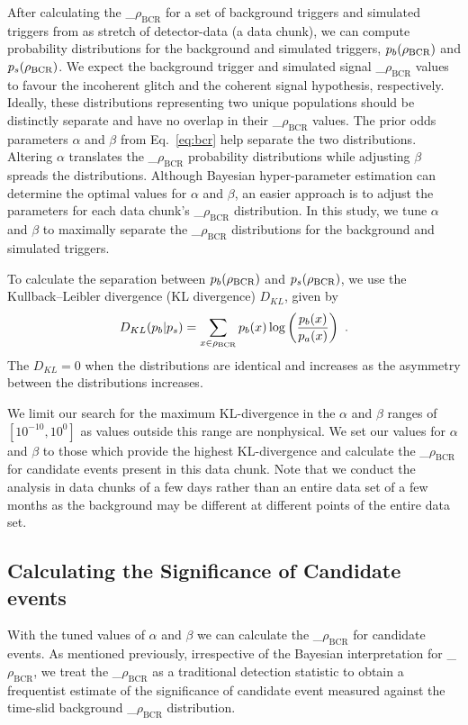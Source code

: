 \documentclass[%
 nofootinbib,
 amsmath,amssymb,
 aps,
 twocolumn
]{revtex4-2}
\newcommand{\mathcmd}[1]{{\sc \relax\ifmmode#1\else $#1$\fi}\xspace}
\newcommand{\bcr}{\mathcmd{\rho_\text{BCR}}}
\begin{document}
After calculating the \bcr for a set of background triggers and simulated triggers from as stretch of detector-data (a data chunk), we can compute probability distributions for the background and simulated triggers, $p_b(\bcr)$ and $p_s(\bcr)$. We expect the background trigger and simulated signal \bcr values to favour the incoherent glitch and the coherent signal hypothesis, respectively. Ideally, these distributions representing two unique populations should be distinctly separate and have no overlap in their \bcr values. The prior odds parameters $\alpha$ and $\beta$ from Eq.~\ref{eq:bcr} help separate the two distributions. Altering $\alpha$ translates the \bcr probability distributions while adjusting $\beta$ spreads the distributions. Although Bayesian hyper-parameter estimation can determine the optimal values for $\alpha$ and $\beta$, an easier approach is to adjust the parameters for each data chunk's \bcr distribution. In this study, we tune $\alpha$ and $\beta$ to maximally separate the \bcr distributions for the background and simulated triggers. 

To calculate the separation between $p_b(\bcr)$ and $p_s(\bcr)$, we use the Kullback--Leibler divergence (KL divergence) $D_{KL}$, given by
\begin{equation}
    D_{KL}(p_b | p_s) = \sum\limits_{x\in \bcr} p_b(x) \log \left( \frac{p_b(x)}{p_a(x)} \right)  \ .
\end{equation}
The $D_{KL}=0$ when the distributions are identical and increases as the asymmetry between the distributions increases. 

We limit our search for the maximum KL-divergence in the $\alpha$ and $\beta$ ranges of $[10^{-10}, 10^0]$ as values outside this range are nonphysical. We set our values for $\alpha$ and $\beta$ to those which provide the highest KL-divergence and calculate the \bcr for candidate events present in this data chunk. Note that we conduct the analysis in data chunks of a few days rather than an entire data set of a few months as the background may be different at different points of the entire data set.

\subsection{Calculating the Significance of Candidate events}
With the tuned values of $\alpha$ and $\beta$ we can calculate the \bcr for candidate events. As mentioned previously, irrespective of the Bayesian interpretation for \bcr, we treat the \bcr as a traditional detection statistic to obtain a frequentist estimate of the significance of candidate event measured against the time-slid background \bcr distribution. 
\end{document}

